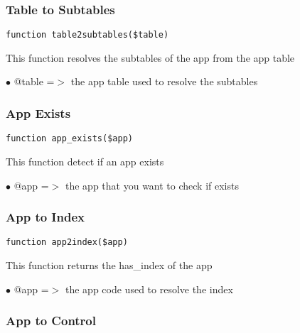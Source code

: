 \documentclass[a4paper]{article}
\begin{document}
\hypertarget{toc25}{}
\subsubsection{Table to Subtables}

\begin{lstlisting}
function table2subtables($table)
\end{lstlisting}

This function resolves the subtables of the app from the app table

\begin{compactitem}
\item[\color{myblue}$\bullet$] @table =$>$ the app table used to resolve the subtables
\end{compactitem}

\hypertarget{toc26}{}
\subsubsection{App Exists}

\begin{lstlisting}
function app_exists($app)
\end{lstlisting}

This function detect if an app exists

\begin{compactitem}
\item[\color{myblue}$\bullet$] @app =$>$ the app that you want to check if exists
\end{compactitem}

\hypertarget{toc27}{}
\subsubsection{App to Index}

\begin{lstlisting}
function app2index($app)
\end{lstlisting}

This function returns the has\_index of the app

\begin{compactitem}
\item[\color{myblue}$\bullet$] @app =$>$ the app code used to resolve the index
\end{compactitem}

\hypertarget{toc28}{}
\subsubsection{App to Control}
\end{document}

